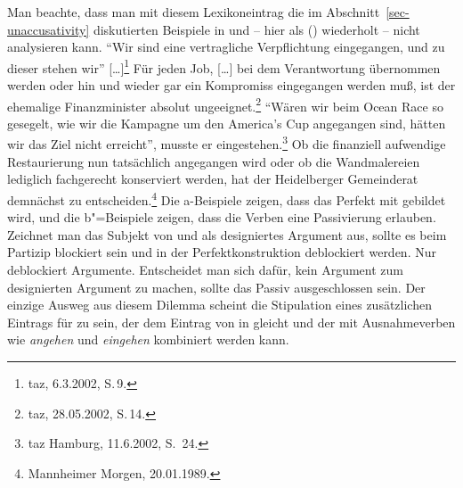 Man beachte, dass man mit diesem Lexikoneintrag die im Abschnitt~\ref{sec-unaccusativity} 
diskutierten Beispiele in  und  --
hier als () wiederholt -- nicht analysieren kann. 
\eal
\label{bsp-eingegangen-all-zwei}
\ex{}
"`Wir sind eine vertragliche Verpflichtung eingegangen, und zu dieser stehen wir"' [\ldots]\footnote{
        taz, 6.3.2002, S.\,9.%
}
\ex\label{bsp-eingegangen-zwei}
Für jeden Job, [\ldots] bei dem Verantwortung übernommen werden oder hin und wieder gar
    ein Kompromiss eingegangen werden muß, ist der ehemalige Finanzminister absolut ungeeignet.\footnote{
        taz, 28.05.2002, S.\,14.%
    }
%
\zl
\eal
\label{bsp-angegangen-all-zwei}
\ex{}
"`Wären wir beim Ocean Race so gesegelt, wie wir die Kampagne um den America's Cup angegangen sind, 
hätten wir das Ziel nicht erreicht"', musste er eingestehen.\footnote{
        taz Hamburg, 11.6.2002, S.\, 24.%
}
%
\ex\label{bsp-angegangen-zwei}
Ob die finanziell
aufwendige Restaurierung nun tatsächlich angegangen wird oder ob die Wandmalereien lediglich fachgerecht konserviert werden, hat der
Heidelberger Gemeinderat demnächst zu entscheiden.\footnote{
        Mannheimer Morgen, 20.01.1989.%
}
\zl
Die a-Beispiele zeigen, dass das Perfekt mit \sein gebildet wird, und die b"=Beispiele zeigen, dass
die Verben eine Passivierung erlauben.
Zeichnet man das Subjekt von  und  
als designiertes Argument aus, sollte es beim Partizip blockiert sein und in der
Perfektkonstruktion deblockiert werden. Nur \haben deblockiert Argumente.
Entscheidet man sich dafür, kein Argument zum designierten Argument zu machen,
sollte das Passiv ausgeschlossen sein. Der einzige Ausweg aus diesem Dilemma
scheint die Stipulation eines zusätzlichen Eintrags für \sein zu sein,
der dem Eintrag von \haben in  gleicht und der 
mit Ausnahmeverben wie \emph{angehen} und \emph{eingehen} kombiniert werden kann.


